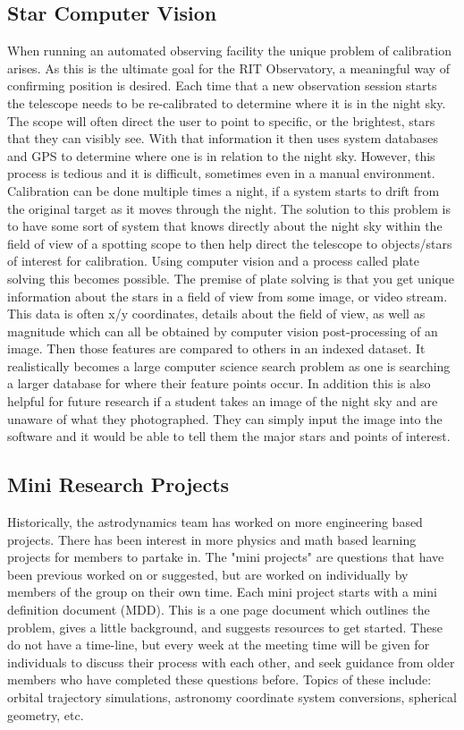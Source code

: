 \documentclass[conference]{IEEEtran} %
\begin{document}
  \subsection{Star Computer Vision}
\label{subsec:star}
 When running an automated observing facility the unique problem of calibration arises. As this is the ultimate goal for the RIT Observatory, a meaningful way of confirming position is desired. Each time that a new observation session starts the telescope needs to be re-calibrated to determine where it is in the night sky. The scope will often direct the user to point to specific, or the brightest, stars that they can visibly see.  With that information it then uses system databases and GPS to determine where one is in relation to the night sky.  However, this process is tedious and it is difficult, sometimes even in a manual environment. Calibration can be done multiple times a night, if a system starts to drift from the original target as it moves through the night. The solution to this problem is to have some sort of system that knows directly about the night sky within the field of view of a spotting scope to then help direct the telescope to objects/stars of interest for calibration.  Using computer vision and a process called plate solving this becomes possible.
The premise of plate solving is that you get unique information about the stars in a field of view from some image, or video stream.  This data is often x/y coordinates, details about the field of view, as well as magnitude which can all be obtained by computer vision post-processing of an image.  Then those features are compared to others in an indexed dataset.  It realistically becomes a large computer science search problem as one is searching a larger database for where their feature points occur.
In addition this is also helpful for future research if a student takes an image of the night sky and are unaware of what they photographed.  They can simply input the image into the software and it would be able to tell them the major stars and points of interest.

  \subsection{Mini Research Projects}
\label{subsec:mini}
 Historically, the astrodynamics team has worked on more engineering based projects. There has been interest in more physics and math based learning projects for members to partake in. The "mini projects" are questions that have been previous worked on or suggested, but are worked on individually by members of the group on their own time. Each mini project starts with a mini definition document (MDD). This is a one page document which outlines the problem, gives a little background, and suggests resources to get started.  These do not have a time-line, but every week at the meeting time will be given for individuals to discuss their process with each other, and seek guidance from older members who have completed these questions before. Topics of these include: orbital trajectory simulations, astronomy coordinate system conversions, spherical geometry, etc.
\end{document}
